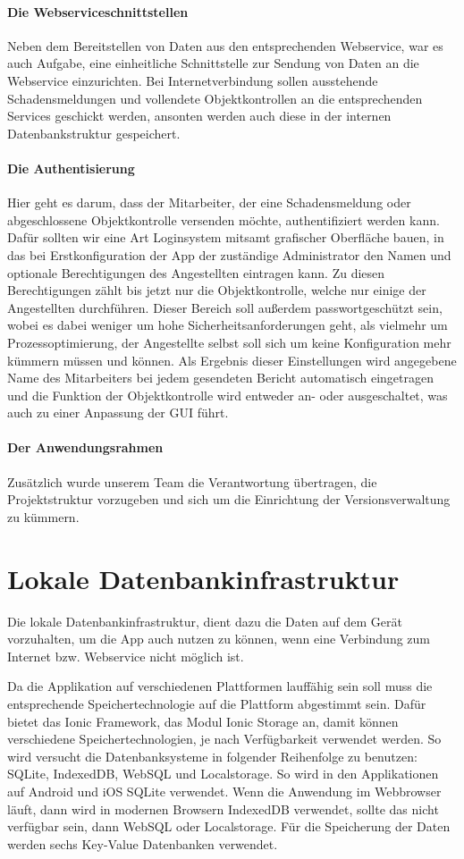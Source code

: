 \documentclass[12pt]{article}
\begin{document}
\paragraph{Die Webserviceschnittstellen} Neben dem Bereitstellen von Daten aus den entsprechenden Webservice, war es auch Aufgabe, eine einheitliche Schnittstelle zur Sendung von Daten an die Webservice einzurichten. Bei Internetverbindung sollen ausstehende Schadensmeldungen und vollendete Objektkontrollen an die entsprechenden Services geschickt werden, ansonten werden auch diese in der internen Datenbankstruktur gespeichert.
\paragraph{Die Authentisierung} Hier geht es darum, dass der Mitarbeiter, der eine Schadensmeldung oder abgeschlossene Objektkontrolle versenden möchte, authentifiziert werden kann. Dafür sollten wir eine Art Loginsystem mitsamt grafischer Oberfläche bauen, in das bei Erstkonfiguration der App der zuständige Administrator den Namen und optionale Berechtigungen des Angestellten eintragen kann. Zu diesen Berechtigungen zählt bis jetzt nur die Objektkontrolle, welche nur einige der Angestellten durchführen. Dieser Bereich soll außerdem passwortgeschützt sein, wobei es dabei weniger um hohe Sicherheitsanforderungen geht, als vielmehr um Prozessoptimierung, der Angestellte selbst soll sich um keine Konfiguration mehr kümmern müssen und können. Als Ergebnis dieser Einstellungen wird angegebene Name des Mitarbeiters bei jedem gesendeten Bericht automatisch eingetragen und die Funktion der Objektkontrolle wird entweder an- oder ausgeschaltet, was auch zu einer Anpassung der GUI führt.
\paragraph{Der Anwendungsrahmen} Zusätzlich wurde unserem Team die Verantwortung übertragen, die Projektstruktur vorzugeben und sich um die Einrichtung der Versionsverwaltung zu kümmern.

\newpage
\section{Lokale Datenbankinfrastruktur}
Die lokale Datenbankinfrastruktur, dient dazu die Daten auf dem Gerät vorzuhalten, um die App auch nutzen zu können, wenn eine Verbindung zum Internet bzw. Webservice nicht möglich ist.

Da die Applikation auf verschiedenen Plattformen lauffähig sein soll muss die entsprechende Speichertechnologie auf die Plattform abgestimmt sein. Dafür bietet das Ionic Framework, das Modul Ionic Storage an, damit können verschiedene Speichertechnologien, je nach Verfügbarkeit verwendet werden. So wird versucht die Datenbanksysteme in folgender Reihenfolge zu benutzen: SQLite, IndexedDB, WebSQL und Localstorage. So wird in den Applikationen auf Android und iOS SQLite verwendet. Wenn die Anwendung im Webbrowser läuft, dann wird in modernen Browsern IndexedDB verwendet, sollte das nicht verfügbar sein, dann WebSQL oder Localstorage. Für die Speicherung der Daten werden sechs Key-Value Datenbanken verwendet. 
\end{document}
